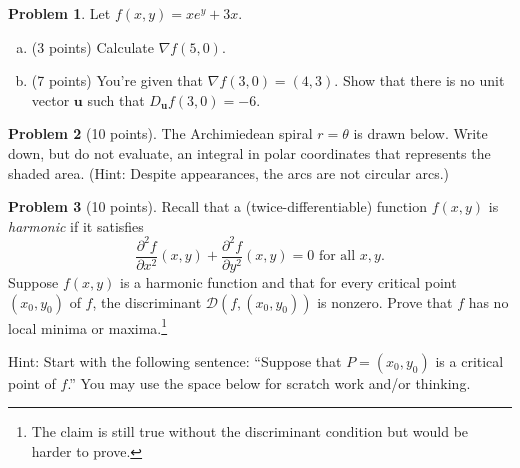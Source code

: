 \documentclass[11pt,oneside]{amsart}
\theoremstyle{definition}
\newtheorem{problem}{Problem}
\theoremstyle{plain}
\newcommand{\bu}{{\mathbf{u}}}
\begin{document}
\newpage

\begin{problem}
  Let $f(x,y)=xe^y+3x$.
  \begin{enumerate}[(a)]
    \item (3 points) Calculate $\nabla f(5,0)$.
    \vfill
    \item (7 points) You're given that $\nabla f(3,0)=(4,3)$. Show that there is no unit vector $\bu$ such that $D_\bu f(3,0)=-6$.
    \vfill
    \vfill
    \vfill
  \end{enumerate}
\end{problem}

\newpage

\begin{problem}[10 points]
  The Archimiedean spiral $r=\theta$ is drawn below. Write down, but do not evaluate, an integral in polar coordinates that represents the shaded area. (Hint: Despite appearances, the arcs are not circular arcs.)
  \begin{center}
  \end{center}
\end{problem}

\newpage

\begin{problem}[10 points]
  Recall that a (twice-differentiable) function $f(x,y)$ is \emph{harmonic} if it satisfies
  \[\frac{\partial^2 f}{\partial x^2}(x,y)+\frac{\partial^2 f}{\partial y^2}(x,y)=0\text{ for all }x,y.\]
  Suppose $f(x,y)$ is a harmonic function and that for every critical point $(x_0,y_0)$ of $f$, the discriminant $\mathcal D(f,(x_0,y_0))$ is nonzero. Prove that $f$ has no local minima or maxima.\footnote{The claim is still true without the discriminant condition but would be harder to prove.}

  Hint: Start with the following sentence: ``Suppose that $P=(x_0,y_0)$ is a critical point of $f$.'' You may use the space below for scratch work and/or thinking.
\end{problem}
\end{document}
